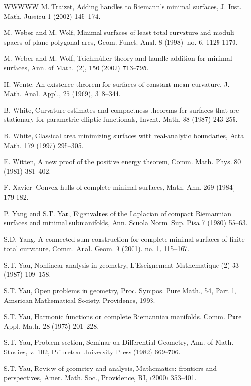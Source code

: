 \begin{thebibliography}{WWWWW}
 M. Traizet, Adding handles to Riemann's minimal surfaces, J. Inst. Math. Jussieu 1 (2002) 145–174.

 M. Weber and M. Wolf, Minimal surfaces of least total curvature and moduli spaces of plane polygonal arcs, Geom. Funct. Anal. 8 (1998), no. 6, 1129-1170.

 M. Weber and M. Wolf, Teichmüller theory and handle addition for minimal surfaces, Ann. of Math. (2), 156 (2002) 713–795.

 H. Wente, An existence theorem for surfaces of constant mean curvature, J. Math. Anal. Appl., 26 (1969), 318–344.

 B. White, Curvature estimates and compactness theorems for surfaces that are stationary for parametric elliptic functionals, Invent. Math. 88 (1987) 243-256.

 B. White, Classical area minimizing surfaces with real-analytic boundaries, Acta Math. 179 (1997) 295–305.

 E. Witten, A new proof of the positive energy theorem, Comm. Math. Phys. 80 (1981) 381–402.

 F. Xavier, Convex hulls of complete minimal surfaces, Math. Ann. 269 (1984) 179-182.

 P. Yang and S.T. Yau, Eigenvalues of the Laplacian of compact Riemannian surfaces and minimal submanifolds, Ann. Scuola Norm. Sup. Pisa 7 (1980) 55–63.

 S.D. Yang, A connected sum construction for complete minimal surfaces of finite total curvature, Comm. Anal. Geom. 9 (2001), no. 1, 115–167.

 S.T. Yau, Nonlinear analysis in geometry, L'Eseignement Mathematique (2) 33 (1987) 109–158.

 S.T. Yau, Open problems in geometry, Proc. Sympos. Pure Math., 54, Part 1, American Mathematical Society, Providence, 1993.

 S.T. Yau, Harmonic functions on complete Riemannian manifolds, Comm. Pure Appl. Math. 28 (1975) 201–228.

 S.T. Yau, Problem section, Seminar on Differential Geometry, Ann. of Math. Studies, v. 102, Princeton University Press (1982) 669–706.

 S.T. Yau, Review of geometry and analysis, Mathematics: frontiers and perspectives, Amer. Math. Soc., Providence, RI, (2000) 353–401.

\end{thebibliography}
